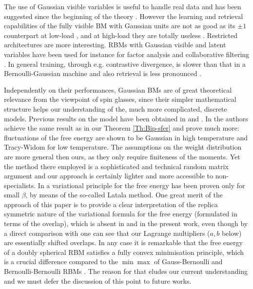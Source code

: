 \documentclass[10pt,oneside,a4paper,reqno]{amsart}  %
\def\b{\beta}
\theoremstyle{plain}
\numberwithin{equation}{section}
\begin{document}
The use of Gaussian visible variables is useful to handle real data and has been suggested since the beginning of the theory \cite{hopG}. However the learning and retrieval capabilities of the fully visible BM with Gaussian units are not as good as its $\pm1 $ counterpart at low-load \cite{lungo}, and at high-load they are totally useless \cite{perez,lungo}.  
Restricted architectures are more interesting. RBMs with Gaussian visible and latent variables have been used for instance for factor analysis \cite{ICC, prodgauss} and collaborative filtering \cite{salamino}. In general training, through e.g. contrastive divergence, is slower than that  in a Bernoulli-Gaussian machine \cite{guide,gaussCD,karakida,decelle} and also retrieval is less pronounced \cite{lungo, RBMs}. 

Independently on their performances, Gaussian BMs are of great theoretical relevance from the viewpoint of spin glasses, since their simpler mathematical structure helps our understanding of the, much more complicated,  discrete models. Previous results on the model have been obtained in \cite{AC} and \cite{baik1}. In \cite{baik1} the authors achieve the same result as in our Theorem \ref{Th:Bip-sfer} and prove much more: fluctuations of the free energy are shown to be Gaussian in high temperature and Tracy-Widom for low temperature. The assumptions on the weight distribution are more general then ours, as they only require finiteness of the moments. Yet the method there employed is a sophisticated and technical random matrix argument and our approach is certainly lighter and more accessible to non-specialists.
In \cite{AC} a variational principle for the free energy has been proven only for small $\b$, by means of the so-called Latala method. One great merit of the approach of this paper is to provide a clear interpretation of the replica symmetric nature of the variational formula for the free energy (formulated in terms of the overlap), which is absent in \cite{baik1} and in the present work, even though by a direct comparison with \cite{legendre} one can see that our Lagrange multipliers ($a,b$ below) are essentially shifted overlaps.  In any case it is remarkable that the free energy of a doubly spherical RBM satisfies a fully convex minimisation principle, which is a crucial difference compared to the $\min\max$ of Gauss-Bernoulli \cite{bgg} and Bernoulli-Bernoulli RBMs \cite{Bip}. The reason for that eludes our current understanding and we must defer the discussion of this point to future works. 

\end{document}
